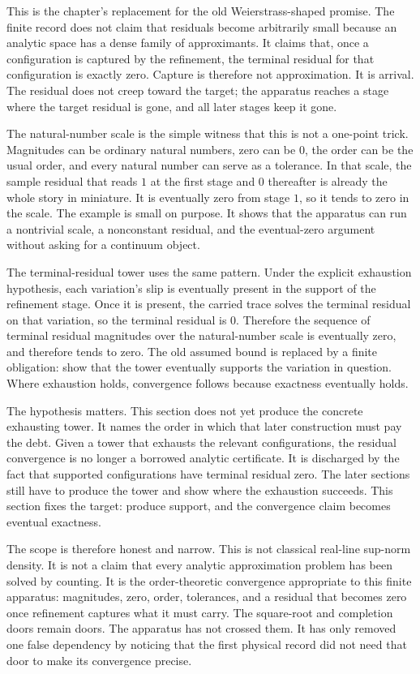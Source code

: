 This is the chapter's replacement for the old Weierstrass-shaped promise. The finite
record does not claim that residuals become arbitrarily small because an analytic
space has a dense family of approximants. It claims that, once a configuration is
captured by the refinement, the terminal residual for that configuration is exactly
zero. Capture is therefore not approximation. It is arrival. The residual does not
creep toward the target; the apparatus reaches a stage where the target residual is
gone, and all later stages keep it gone.

The natural-number scale is the simple witness that this is not a one-point trick.
Magnitudes can be ordinary natural numbers, zero can be \(0\), the order can be the
usual order, and every natural number can serve as a tolerance. In that scale, the
sample residual that reads \(1\) at the first stage and \(0\) thereafter is already
the whole story in miniature. It is eventually zero from stage \(1\), so it tends to
zero in the scale. The example is small on purpose. It shows that the apparatus can
run a nontrivial scale, a nonconstant residual, and the eventual-zero argument
without asking for a continuum object.

The terminal-residual tower uses the same pattern. Under the explicit exhaustion
hypothesis, each variation's slip is eventually present in the support of the
refinement stage. Once it is present, the carried trace solves the terminal residual
on that variation, so the terminal residual is \(0\). Therefore the sequence of
terminal residual magnitudes over the natural-number scale is eventually zero, and
therefore tends to zero. The old assumed bound is replaced by a finite obligation:
show that the tower eventually supports the variation in question. Where exhaustion
holds, convergence follows because exactness eventually holds.

The hypothesis matters. This section does not yet produce the concrete exhausting
tower. It names the order in which that later construction must pay the debt. Given
a tower that exhausts the relevant configurations, the residual convergence is no
longer a borrowed analytic certificate. It is discharged by the fact that supported
configurations have terminal residual zero. The later sections still have to produce
the tower and show where the exhaustion succeeds. This section fixes the target:
produce support, and the convergence claim becomes eventual exactness.

The scope is therefore honest and narrow. This is not classical real-line
sup-norm density. It is not a claim that every analytic approximation problem has
been solved by counting. It is the order-theoretic convergence appropriate to this
finite apparatus: magnitudes, zero, order, tolerances, and a residual that becomes
zero once refinement captures what it must carry. The square-root and completion
doors remain doors. The apparatus has not crossed them. It has only removed one
false dependency by noticing that the first physical record did not need that door
to make its convergence precise.

